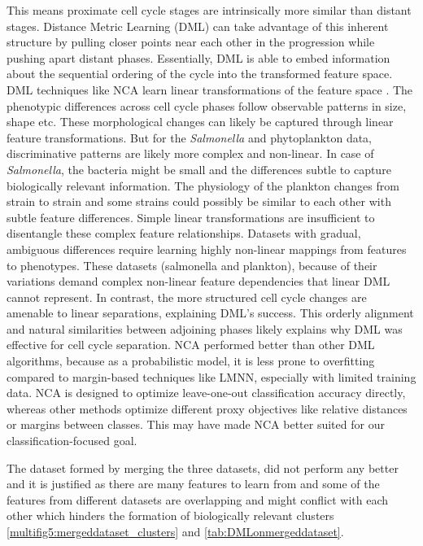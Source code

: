 \documentclass[12pt,a4paper]{article}
\begin{document}
This means proximate cell cycle stages are intrinsically more similar than distant stages. Distance Metric Learning (DML) can take advantage of this inherent structure by pulling closer points near each other in the progression while pushing apart distant phases. Essentially, DML is able to embed information about the sequential ordering of the cycle into the transformed feature space. DML techniques like NCA learn linear transformations of the feature space \cite{NCA}. The phenotypic differences across cell cycle phases follow observable patterns in size, shape etc. These morphological changes can likely be captured through linear feature transformations. But for the \textit{Salmonella} and phytoplankton data, discriminative patterns are likely more complex and non-linear. In case of \textit{Salmonella}, the bacteria might be small and the differences subtle to capture biologically relevant information. The physiology of the plankton changes from strain to strain and some strains could possibly be similar to each other with subtle feature differences. Simple linear transformations are insufficient to disentangle these complex feature relationships. Datasets with gradual, ambiguous differences require learning highly non-linear mappings from features to phenotypes. These datasets (salmonella and plankton), because of their variations demand complex non-linear feature dependencies that linear DML cannot represent. In contrast, the more structured cell cycle changes are amenable to linear separations, explaining DML's success. This orderly alignment and natural similarities between adjoining phases likely explains why DML was effective for cell cycle separation. NCA performed better than other DML algorithms, because as a probabilistic model, it is less prone to overfitting compared to margin-based techniques like LMNN, especially with limited training data. NCA is designed to optimize leave-one-out classification accuracy directly, whereas other methods optimize different proxy objectives like relative distances or margins between classes. This may have made NCA better suited for our classification-focused goal.

The dataset formed by merging the three datasets, did not perform any better and it is justified as there are many features to learn from and some of the features from different datasets are overlapping and might conflict with each other which hinders the formation of biologically relevant clusters \ref{multifig5:mergeddataset_clusters} and \ref{tab:DMLonmergeddataset}.
\end{document}
